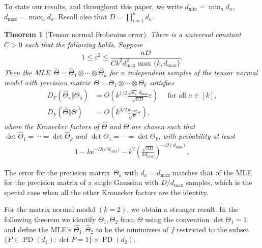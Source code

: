 \documentclass[aos]{imsart}
\newtheorem{theorem}{Theorem}[section]
\theoremstyle{definition}
\numberwithin{equation}{section}
\DeclareMathOperator{\op}{op}
\DeclareMathOperator{\PD}{PD}
\newcommand{\htheta}{\widehat{\Theta}}
\newcommand{\ot}{\otimes}
\newcommand{\eps}{\varepsilon}
\begin{document}
To state our results, and throughout this paper, we write $d_{\min} = \min_a d_a$, $d_{\max} = \max_a d_a$.
Recall also that $D = \prod_{i=1}^k d_a$.
\newcommand{\TensorFrob}[2]{%
There is a universal constant~$C>0$ such that the following holds.
Suppose
\begin{#1}#2
  1 \leq \eps^2 \leq \frac{nD}{C k^2 d_{\max}^2 \max\{k, d_{\max}\}}.
\end{#1}
Then the MLE~$\htheta = \htheta_1 \ot \cdots \ot \htheta_k$ for $n$ independent samples of the tensor normal model with precision matrix~$\Theta = \Theta_1 \ot \cdots \ot \Theta_k$ satisfies
\begin{align*}
  D_F(\htheta_a\Vert\Theta_a) &= O\left(k^{1/2} \frac{\sqrt{d_a} \, d_{\max}}{\sqrt{n D}} \eps\right) \quad\text{ for all } a\in[k], \\
  D_F(\htheta\Vert\Theta) &= O\left(k^{3/2} \frac{d_{\max}}{\sqrt{n}} \eps\right),
\end{align*}
where the Kronecker factors of $\htheta$ and $\Theta$ are chosen such that $\det\htheta_1 = \cdots = \det\htheta_k$ and $\det\Theta_1 = \cdots = \det\Theta_k$, with probability at least
\begin{align*}
  1 - k e^{-\Omega\bigl( \eps^2 d_{\max} \bigr)} - k^2 \left( \frac{\sqrt{nD}}{k d_{\max}} \right)^{-\Omega(d_{\min})},
\end{align*}}

\begin{theorem}[Tensor normal Frobenius error]\label{thm:tensor-frobenius}
\TensorFrob{equation}{\label{eq:eps sqr assm}}
\end{theorem}

The error for the precision matrix~$\Theta_a$ with $d_a = d_{\max}$ matches that of the MLE for the precision matrix of a single Gaussian with $D/d_{\max}$ samples, which is the special case when all the other Kronecker factors are the identity. 

For the matrix normal model $(k=2)$, we obtain a stronger result. In the following theorem we identify $\Theta_1, \Theta_2$ from $\Theta$ using the convention $\det \Theta_1 = 1$, and define the MLE's $\htheta_1, \htheta_2$ to be the minimizers of $f$ restricted to the subset $\{P \in \PD(d_1): \det P = 1\} \times \PD(d_2)$. 

\newcommand{\MatrixSpec}{%
There is a universal constant~$C>0$ with the following property.
Suppose $d_1 \leq d_2$ and $n \geq C \frac{d_2}{d_1} \max \{\log \frac{d_2}{d_1},  \frac{\log^2 d_1}{\eps^2}\}$. Then the MLE $\htheta = \htheta_1 \ot \htheta_2$ for $n$ independent samples from the matrix normal model with precision matrix $\Theta = \Theta_1 \ot \Theta_2$ satisfies
\begin{align*}
  D_{\op}(\widehat{\Theta}_1 \Vert \Theta_1) = O\left(\eps \sqrt{\frac{d_1}{nd_2}} \log d_1\right)
\quad\text{and}\quad
D_{\op}(\widehat{\Theta}_2 \Vert \Theta_2) = O\left(\eps \sqrt{\frac{d_2}{nd_1}}\right),
\end{align*}
with probability at least  $1 - O(e^{ - \Omega( d_1 \eps^2)})$. }
\end{document}
